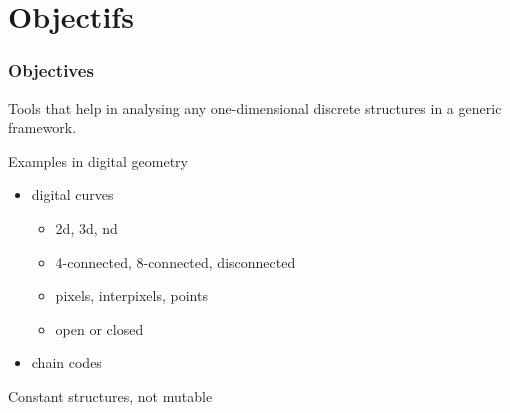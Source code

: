 
\section{Objectifs}

\begin{frame}
\frametitle{Objectives}

Tools that help in analysing any one-dimensional discrete structures in a generic framework. 

  \begin{block}{Examples in digital geometry}
    \begin{itemize}
    \item digital curves
      \begin{itemize}
      \item 2d, 3d, nd
      \item 4-connected, 8-connected, disconnected
      \item pixels, interpixels, points
      \item open or closed
      \end{itemize}
		\item chain codes
    \end{itemize}
  \end{block}

\alert{Constant structures, not mutable} 

\end{frame}


